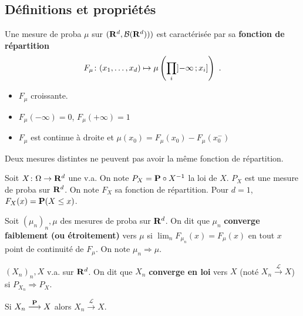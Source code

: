 \subsection{Définitions et propriétés}

	\begin{defn}
		Une mesure de proba $\mu$ sur $(\mathbf{R}^d, \mathcal{B}(\mathbf{R}^d)))$ est caractérisée par sa \textbf{fonction de répartition}
		$$F_\mu \colon (x_1,\ldots,x_d) \mapsto \mu \left( \prod_i \mathopen{}\mathclose{\left]-\infty\mathclose{}\mathpunct{};x_i\right]} \right)\ .$$
	\end{defn}
	
	\begin{pop}
		\begin{itemize}
			\item[\textbullet] $F_\mu$ croissante.
			\item[\textbullet] $F_\mu(-\infty) = 0$, $F_\mu(+\infty) = 1$
			\item[\textbullet] $F_\mu$ est continue à droite et $\mu({x_0}) = F_\mu(x_0) - F_\mu(x_0^-)$
		\end{itemize}
	\end{pop}
	
	\begin{thm}
		Deux mesures distintes ne peuvent pas avoir la même fonction de répartition.
	\end{thm}
	
	Soit $X \colon \Omega \to \mathbf{R}^d$ une v.a.
	On note $P_X = \mathbf{P} \circ X^{-1}$ la loi de $X$.
	$P_X$ est une mesure de proba sur $\mathbf{R}^d$.
	On note $F_X$ sa fonction de répartition.
	Pour $d = 1$, $F_X(x) = \mathbf{P}(X \leq x)$.
	
	\begin{defn}
		Soit $(\mu_n)_n, \mu$ des mesures de proba sur $\mathbf{R}^d$.
		On dit que $\mu_n$ \textbf{converge faiblement (ou étroitement)} vers $\mu$ si $\lim_n F_{\mu_n}(x) = F_\mu(x)$ en tout $x$ point de continuité de $F_\mu$.
		On note $\mu_n \Rightarrow \mu$.
	\end{defn}

	\begin{defn}
		$(X_n)_n, X$ v.a. sur $\mathbf{R}^d$.
		On dit que $X_n$ \textbf{converge en loi} vers $X$ (noté $X_n \overset{\mathcal{L}}{\longrightarrow} X$) si $P_{X_n} \Rightarrow P_X$.
	\end{defn}

	\begin{pop}
		Si $X_n \overset{\mathbf{P}}{\longrightarrow} X$ alors $X_n \overset{\mathcal{L}}{\longrightarrow} X$.
	\end{pop}


